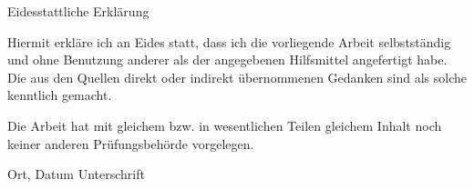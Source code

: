 Eidesstattliche Erklärung

\vspace{2cm}

Hiermit erkläre ich an Eides statt, dass ich die vorliegende Arbeit
selbstständig und ohne Benutzung anderer als der angegebenen Hilfsmittel
angefertigt habe. Die aus den Quellen direkt oder indirekt übernommenen
Gedanken sind als solche kenntlich gemacht.

\vspace{1cm}

Die Arbeit hat mit gleichem bzw. in wesentlichen Teilen gleichem Inhalt noch
keiner anderen Prüfungsbehörde vorgelegen.

\vspace{4cm}

Ort, Datum \hspace{5cm} Unterschrift